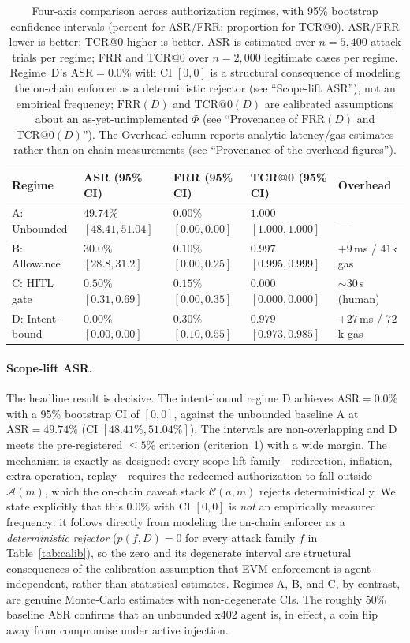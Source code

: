 \documentclass[10pt,twocolumn,letterpaper]{article}
\begin{document}
\begin{table}[t]
\centering
\caption{Four-axis comparison across authorization regimes, with 95\% bootstrap confidence intervals (percent for ASR/FRR; proportion for TCR@0). ASR/FRR lower is better; TCR@0 higher is better. ASR is estimated over $n=5{,}400$ attack trials per regime; FRR and TCR@0 over $n=2{,}000$ legitimate cases per regime. Regime~D's $\mathrm{ASR}=0.0\%$ with CI $[0,0]$ is a structural consequence of modeling the on-chain enforcer as a deterministic rejector (see ``Scope-lift ASR''), not an empirical frequency; $\mathrm{FRR}(D)$ and $\mathrm{TCR@0}(D)$ are calibrated assumptions about an as-yet-unimplemented $\Phi$ (see ``Provenance of $\mathrm{FRR}(D)$ and $\mathrm{TCR@0}(D)$''). The Overhead column reports analytic latency/gas estimates rather than on-chain measurements (see ``Provenance of the overhead figures'').}
\label{tab:main}
\small
\begin{tabular}{lllll}
\toprule
Regime & ASR (95\% CI) & FRR (95\% CI) & TCR@0 (95\% CI) & Overhead \\
\midrule
A: Unbounded    & $49.74\%$ $[48.41,51.04]$ & $0.00\%$ $[0.00,0.00]$ & $1.000$ $[1.000,1.000]$ & --- \\
B: Allowance    & $30.0\%$ $[28.8,31.2]$    & $0.10\%$ $[0.00,0.25]$ & $0.997$ $[0.995,0.999]$ & $+9$\,ms / $41$k gas \\
C: HITL gate    & $0.50\%$ $[0.31,0.69]$    & $0.15\%$ $[0.00,0.35]$ & $0.000$ $[0.000,0.000]$ & $\sim$$30$\,s (human) \\
D: Intent-bound & $\mathbf{0.00\%}$ $[0.00,0.00]$ & $0.30\%$ $[0.10,0.55]$ & $\mathbf{0.979}$ $[0.973,0.985]$ & $+27$\,ms / $72$k gas \\
\bottomrule
\end{tabular}
\end{table}

\paragraph{Scope-lift ASR.} The headline result is decisive. The intent-bound regime D achieves $\mathrm{ASR}=0.0\%$ with a 95\% bootstrap CI of $[0,0]$, against the unbounded baseline A at $\mathrm{ASR}=49.74\%$ (CI $[48.41\%,51.04\%]$). The intervals are non-overlapping and D meets the pre-registered $\le5\%$ criterion (criterion~1) with a wide margin. The mechanism is exactly as designed: every scope-lift family---redirection, inflation, extra-operation, replay---requires the redeemed authorization to fall outside $\mathcal{A}(m)$, which the on-chain caveat stack $\mathcal{C}(a,m)$ rejects deterministically. We state explicitly that this $0.0\%$ with CI $[0,0]$ is \emph{not} an empirically measured frequency: it follows directly from modeling the on-chain enforcer as a \emph{deterministic rejector} ($p(f,D)=0$ for every attack family $f$ in Table~\ref{tab:calib}), so the zero and its degenerate interval are structural consequences of the calibration assumption that EVM enforcement is agent-independent, rather than statistical estimates. Regimes A, B, and C, by contrast, are genuine Monte-Carlo estimates with non-degenerate CIs. The roughly 50\% baseline ASR confirms that an unbounded x402 agent is, in effect, a coin flip away from compromise under active injection.
\end{document}
